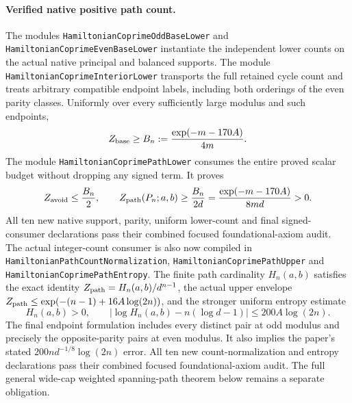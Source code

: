 \paragraph{Verified native positive path count.}
The modules \texttt{HamiltonianCoprimeOddBaseLower} and
\texttt{HamiltonianCoprimeEvenBaseLower} instantiate the independent
lower counts on the actual native principal and balanced supports.
The module \texttt{HamiltonianCoprimeInteriorLower} transports the
full retained cycle count and treats arbitrary compatible endpoint
labels, including both orderings of the even parity classes.
Uniformly over every sufficiently large modulus and such endpoints,
\[
 Z_{\rm base}\geq B_n:=\frac{\exp(-m-170A)}{4m}.
\]
The module \texttt{HamiltonianCoprimePathLower} consumes the entire
proved scalar budget without dropping any signed term. It proves
\[
 Z_{\rm avoid}\leq\frac{B_n}{2},\qquad
 Z_{\rm path}(P_n;a,b)\geq\frac{B_n}{2d}
             =\frac{\exp(-m-170A)}{8md}>0.
\]
All ten new native support, parity, uniform lower-count and final
signed-consumer declarations pass their combined focused
foundational-axiom audit.
The actual integer-count consumer is also now compiled in
\texttt{HamiltonianPathCountNormalization},
\texttt{HamiltonianCoprimePathUpper} and
\texttt{HamiltonianCoprimePathEntropy}.
The finite path cardinality \(H_n(a,b)\) satisfies the exact identity
\(Z_{\rm path}=H_n(a,b)/d^{n-1}\), the actual upper envelope
\(Z_{\rm path}\leq\exp(-(n-1)+16A\log(2n))\), and the stronger
uniform entropy estimate
\[
 H_n(a,b)>0,\qquad
 \left|\log H_n(a,b)-n(\log d-1)\right|\leq200A\log(2n).
\]
The final endpoint formulation includes every distinct pair at odd
modulus and precisely the opposite-parity pairs at even modulus.
It also implies the paper's stated \(200nd^{-1/8}\log(2n)\)
error. All ten new count-normalization and entropy declarations pass
their combined focused foundational-axiom audit.
The full general wide-cap weighted spanning-path theorem below
remains a separate obligation.

